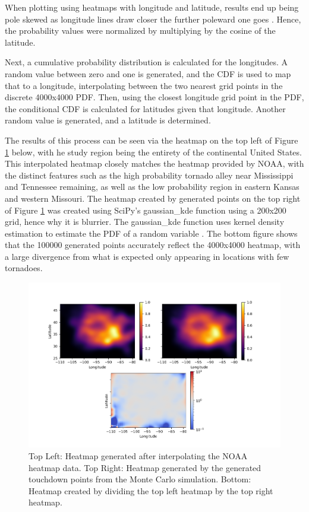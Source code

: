 \documentclass[12pt]{article}
\begin{document}
When plotting using heatmaps with longitude and latitude, results end up being pole skewed as longitude lines draw closer the further poleward one goes \cite{strader}. Hence, the probability values were normalized by multiplying by the cosine of the latitude. \par
Next, a cumulative probability distribution is calculated for the longitudes. A random value between zero and one is generated, and the CDF is used to map that to a longitude, interpolating between the two nearest grid points in the discrete 4000x4000 PDF. Then, using the closest longitude grid point in the PDF, the conditional CDF is calculated for latitudes given that longitude. Another random value is generated, and a latitude is determined. \par
The results of this process can be seen via the heatmap on the top left of Figure \ref{fig:heatmapresults} below, with he study region being the entirety of the continental United States. This interpolated heatmap closely matches the heatmap provided by NOAA, with the distinct features such as the high probability tornado alley near Mississippi and Tennessee remaining, as well as the low probability region in eastern Kansas and western Missouri. The heatmap created by generated points on the top right of Figure \ref{fig:heatmapresults} was  created using SciPy’s gaussian\_kde function using a 200x200 grid, hence why it is blurrier. The gaussian\_kde function uses kernel density estimation to estimate the PDF of a random variable \cite{scipy}. The bottom figure shows that the 100000 generated points accurately reflect the 4000x4000 heatmap, with a large divergence from what is expected only appearing in locations with few tornadoes. \par
\begin{figure}[ht]
    \centering %
    \includegraphics[width=\textwidth]{heatmapresults.png}
    \caption[Generated and simulated tornado heatmaps over the continental U.S]{Top Left: Heatmap generated after interpolating the NOAA heatmap data. Top Right: Heatmap generated by the generated touchdown points from the Monte Carlo simulation. Bottom: Heatmap created by dividing the top left heatmap by the top right heatmap.}
    \label{fig:heatmapresults}
\end{figure}
\end{document}
